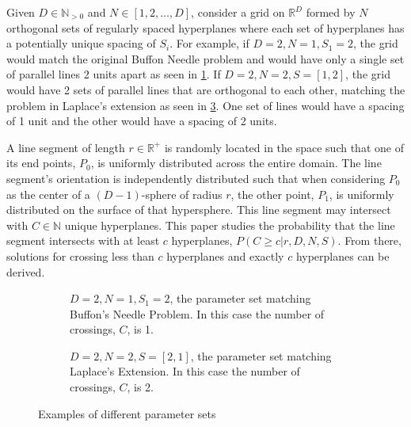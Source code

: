 \documentclass{article}
\begin{document}
Given $D\in\mathbb{N}_{>0}$ and $N\in[1,2,\dots,D]$, consider a grid on $\mathbb{R}^D$ formed by $N$ orthogonal sets of regularly spaced hyperplanes where each set of hyperplanes
has a potentially unique spacing of $S_i$. For example, if $D=2, N=1, S_1=2$, the grid would match the original Buffon Needle problem and would have only a single set of parallel lines 2 units apart as seen in \ref{fig:buffon example}.
If $D=2, N=2, S=[1, 2]$, the grid would have 2 sets of parallel lines that are orthogonal to each other, matching the problem in Laplace's extension as seen in \ref{fig:laplace example}. One set of lines would have a spacing of 1 unit and 
the other would have a spacing of 2 units.

A line segment of length $r\in\mathbb{R}^+$ is randomly located in the space such that one of its end points, $P_0$, is uniformly distributed
across the entire domain. The line segment's orientation is independently distributed such that when considering $P_0$ as the center of a $(D-1)$-sphere of radius $r$, the other point, $P_1$,
is uniformly distributed on the surface of that hypersphere. This line segment may intersect with $C\in\mathbb{N}$ unique hyperplanes. This paper studies the probability that the line segment
intersects with at least $c$ hyperplanes, $P(C\ge c|r, D, N, S)$. From there, solutions for crossing less than $c$ hyperplanes and exactly $c$ hyperplanes can
be derived.
\begin{figure}[H]
	\centering
	\begin{subfigure}{0.45\textwidth}
		\centering
		\caption{$D=2, N=1, S_1=2$, the parameter set matching Buffon's Needle Problem. In this case the number of crossings, $C$, is 1.}
		\label{fig:buffon example}
	\end{subfigure}
	\hspace{1cm}
	\begin{subfigure}{0.45\textwidth}
		\centering
		\caption{$D=2, N=2, S=[2,1]$, the parameter set matching Laplace's Extension. In this case the number of crossings, $C$, is 2.}
		\label{fig:laplace example}
	\end{subfigure}
	\caption{Examples of different parameter sets}
\end{figure}
\end{document}
